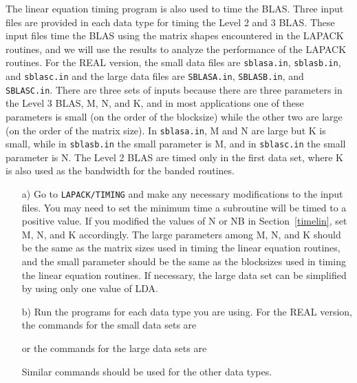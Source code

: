 \dent
The linear equation timing program is also used to time the BLAS.
Three input files are provided in each data type for timing the Level
2 and 3 BLAS. 
These input files time the BLAS using the matrix shapes encountered
in the LAPACK routines, and we will use the results to analyze the
performance of the LAPACK routines. 
For the REAL version, the small data files are
{\tt sblasa.in}, {\tt sblasb.in}, and {\tt sblasc.in}
and the large data files are
{\tt SBLASA.in}, {\tt SBLASB.in}, and {\tt SBLASC.in}.
There are three sets of inputs because there are three
parameters in the Level 3 BLAS, M, N, and K, and
in most applications one of these parameters is small (on the order
of the blocksize) while the other two are large (on the order of the
matrix size).  
In {\tt sblasa.in}, M and N are large but K is
small, while in {\tt sblasb.in} the small parameter is M, and
in {\tt sblasc.in} the small parameter is N.  
The Level 2 BLAS are timed only in the first data set, where K
is also used as the bandwidth for the banded routines.

\begin{itemize}

\item[a)]
Go to {\tt LAPACK/TIMING} and
make any necessary modifications to the input files.
You may need to set the minimum time a subroutine will
be timed to a positive value.
If you modified the values of N or NB 
in Section~\ref{timelin}, set M, N, and K accordingly.
The large parameters among M, N, and K
should be the same as the matrix sizes used in timing the linear
equation routines,
and the small parameter should be the same as the
blocksizes used in timing the linear equation routines.
If necessary, the large data set can be simplified by using only one
value of LDA.

\item[b)]
Run the programs for each data type you are using. 
For the REAL version, the commands for the small data sets are

or the commands for the large data sets are

\noindent
Similar commands should be used for the other data types.
\end{itemize}

